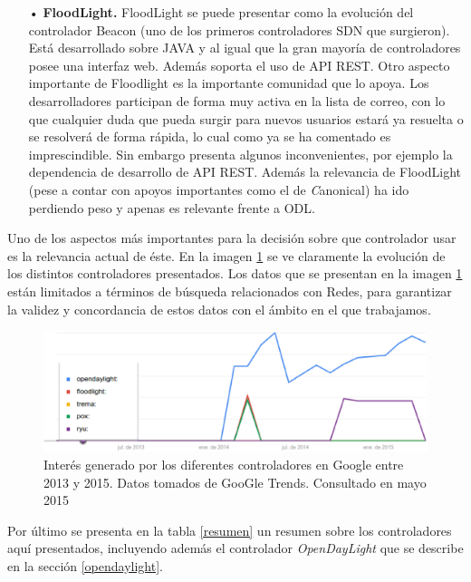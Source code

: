 \documentclass[a4paper,11pt]{book}
\begin{document}
\begin{itemize}
\item[•]\textbf{FloodLight.}\cite{floodlight} FloodLight se puede presentar como la evolución del controlador Beacon (uno de los primeros controladores \ac{SDN} que surgieron).  Está desarrollado sobre JAVA y al igual que la gran mayoría de controladores posee una interfaz web. Además soporta el uso de \ac{API} \ac{REST}. Otro aspecto importante de Floodlight es la importante comunidad que lo apoya. Los desarrolladores participan de forma muy activa en la lista de correo, con lo que cualquier duda que pueda surgir para nuevos usuarios estará ya resuelta o se resolverá de forma rápida, lo cual como ya se ha comentado es imprescindible. Sin embargo presenta algunos inconvenientes, por ejemplo la dependencia de desarrollo de \ac{API} \ac{REST}. Además la relevancia de FloodLight (pese a contar con apoyos importantes como el de \textit{C}anonical) ha ido perdiendo peso y apenas es relevante frente a \ac{ODL}.

\end{itemize}

Uno de los aspectos más importantes para la decisión sobre que controlador usar es la relevancia actual de éste. En la imagen \ref{controllerTrend} se ve claramente la evolución de los distintos controladores presentados. Los datos que se presentan en la imagen \ref{controllerTrend} están limitados a términos de búsqueda relacionados con Redes, para garantizar la validez y concordancia de estos datos con el ámbito en el que trabajamos.

\begin{figure}[tb]
\centering
\includegraphics[scale=0.55]{./figuras/controllerTrend}
\caption[Interés de búsqueda de controladores en GooGle]{Interés generado por los diferentes controladores en Google entre 2013 y 2015. Datos tomados de GooGle Trends. Consultado en mayo 2015}\label{controllerTrend}
\end{figure}

Por último se presenta en la tabla \ref{resumen} un resumen sobre los controladores aquí presentados, incluyendo además el controlador \emph{OpenDayLight} que se describe en la sección \ref{opendaylight}.
\end{document}
